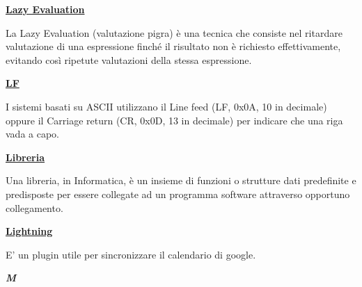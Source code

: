 \vspace*{2\bigskipamount}

\begin{addmargin}[0em]{0em}	
	\textbf{\underline{Lazy Evaluation}}
\end{addmargin}

\medskip
\begin{addmargin}[5em]{1em}	
La Lazy Evaluation (valutazione pigra) è una tecnica che consiste nel ritardare valutazione di una espressione finché il risultato non è richiesto effettivamente, evitando così ripetute valutazioni della stessa espressione.
\end{addmargin}	


\bigskip

\begin{addmargin}[0em]{0em}	
	\textbf{\underline{LF}}
\end{addmargin}

\medskip
\begin{addmargin}[5em]{1em}	
I sistemi basati su ASCII utilizzano il Line feed (LF, 0x0A, 10 in decimale) oppure il Carriage return (CR, 0x0D, 13 in decimale) per indicare che una riga vada a capo.
\end{addmargin}	


\bigskip
\begin{addmargin}[0em]{0em}	
	\textbf{\underline{Libreria}}
\end{addmargin}

\medskip
\begin{addmargin}[5em]{1em}	
Una libreria, in Informatica, è un insieme di funzioni o strutture dati predefinite e predisposte per essere collegate ad un programma software attraverso opportuno collegamento.
\end{addmargin}	


\bigskip
\begin{addmargin}[0em]{0em}	
	\textbf{\underline{Lightning}}
\end{addmargin}
	
\medskip
\begin{addmargin}[5em]{1em}	
E' un plugin utile per sincronizzare il calendario di google.
\end{addmargin}


\newpage

\cleardoublepage
{}
{}
\noindent\hrulefill\hspace{4mm}\textbf{\textsl{\Huge{M}}}\hspace{4mm}\hrulefill

